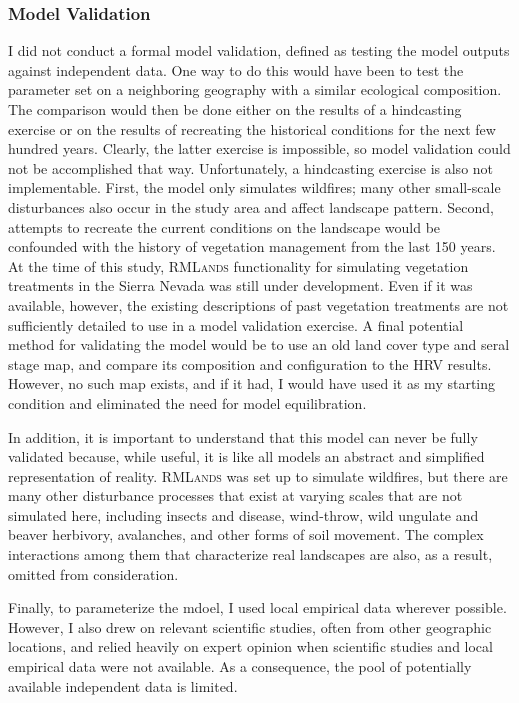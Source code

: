 \subsubsection*{Model Validation} I did not conduct a formal model validation, defined as testing the model outputs against independent data. One way to do this would have been to test the parameter set on a neighboring geography with a similar ecological composition. The comparison would then be done either on the results of a hindcasting exercise or on the results of recreating the historical conditions for the next few hundred years. Clearly, the latter exercise is impossible, so model validation could not be accomplished that way. Unfortunately, a hindcasting exercise is also not implementable. First, the model only simulates wildfires; many other small-scale disturbances also occur in the study area and affect landscape pattern. Second, attempts to recreate the current conditions on the landscape would be confounded with the history of vegetation management from the last 150 years. At the time of this study, \textsc{RMLands} functionality for simulating vegetation treatments in the Sierra Nevada was still under development. Even if it was available, however, the existing descriptions of past vegetation treatments are not sufficiently detailed to use in a model validation exercise. A final potential method for validating the model would be to use an old land cover type and seral stage map, and compare its composition and configuration to the HRV results. However, no such map exists, and if it had, I would have used it as my starting condition and eliminated the need for model equilibration.

In addition, it is important to understand that this model can never be fully validated because, while useful, it is like all models an abstract and simplified representation of reality. \textsc{RMLands} was set up to simulate wildfires, but there are many other disturbance processes that exist at varying scales that are not simulated here, including insects and disease, wind-throw, wild ungulate and beaver herbivory, avalanches, and other forms of soil movement. The complex interactions among them that characterize real landscapes are also, as a result, omitted from consideration.

Finally, to parameterize the mdoel, I used local empirical data wherever possible. However, I also drew on relevant scientific studies, often from other geographic locations, and relied heavily on expert opinion when scientific studies and local empirical data were not available. As a consequence, the pool of potentially available independent data is limited. 

